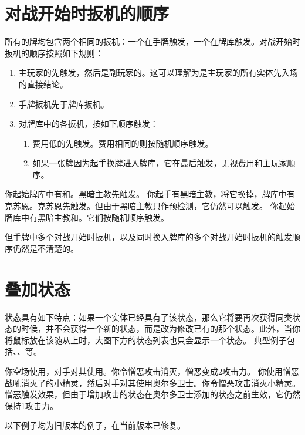 \section{对战开始时扳机的顺序}

所有的牌均包含两个相同的扳机：一个在手牌触发，一个在牌库触发。对战开始时扳机的顺序按照如下规则：

\begin{enumerate}
    \item 主玩家的先触发，然后是副玩家的。这可以理解为是主玩家的所有实体先入场的直接结论。
    \item 手牌扳机先于牌库扳机。
    \item 对牌库中的各扳机，按如下顺序触发：
    \begin{enumerate}
        \item 费用低的先触发。费用相同的则按随机顺序触发。
        \item 如果一张牌因为起手换牌进入牌库，它在最后触发，无视费用和主玩家顺序。
    \end{enumerate}
\end{enumerate}

\example 你起始牌库中有和。黑暗主教先触发。
\example 你起手有黑暗主教，将它换掉，牌库中有克苏恩。克苏恩先触发。但由于黑暗主教只作预检测，它仍然可以触发。
\example 你起始牌库中有黑暗主教和。它们按随机顺序触发。

但手牌中多个对战开始时扳机，以及同时换入牌库的多个对战开始时扳机的触发顺序仍然是不清楚的。

\section{叠加状态}

 状态具有如下特点：如果一个实体已经具有了该状态，那么它将要再次获得同类状态的时候，并不会获得一个新的状态，而是改为修改已有的那个状态。此外，当你将鼠标放在该随从上时，大图下方的状态列表也只会显示一个状态。
\example 典型例子包括、、等。

\example 你空场使用，对手对其使用。你令憎恶攻击消灭，憎恶变成2攻击力。
\example 你使用憎恶战吼消灭了的小精灵，然后对手对其使用奥尔多卫士。你令憎恶攻击消灭小精灵。憎恶触发效果，但由于增加攻击的状态在奥尔多卫士添加的状态之前生效，它仍然保持1攻击力。

以下例子均为旧版本的例子，在当前版本已修复。


